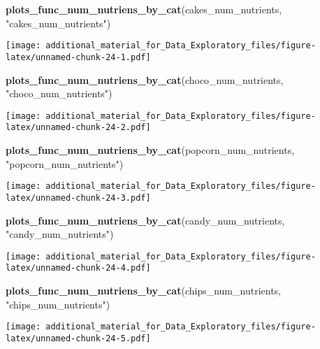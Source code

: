 \documentclass[
]{article}
\newenvironment{Shaded}{\begin{snugshade}}{\end{snugshade}}
\newcommand{\FunctionTok}[1]{\textcolor[rgb]{0.13,0.29,0.53}{\textbf{#1}}}
\newcommand{\NormalTok}[1]{#1}
\newcommand{\StringTok}[1]{\textcolor[rgb]{0.31,0.60,0.02}{#1}}
\begin{document}
\begin{Shaded}
\begin{Highlighting}[]
\FunctionTok{plots\_func\_num\_nutriens\_by\_cat}\NormalTok{(cakes\_num\_nutrients, }\StringTok{"cakes\_num\_nutrients"}\NormalTok{)}
\end{Highlighting}
\end{Shaded}

\texttt{[image: additional\_material\_for\_Data\_Exploratory\_files/figure-latex/unnamed-chunk-24-1.pdf]}

\begin{Shaded}
\begin{Highlighting}[]
\FunctionTok{plots\_func\_num\_nutriens\_by\_cat}\NormalTok{(choco\_num\_nutrients, }\StringTok{"choco\_num\_nutrients"}\NormalTok{)}
\end{Highlighting}
\end{Shaded}

\texttt{[image: additional\_material\_for\_Data\_Exploratory\_files/figure-latex/unnamed-chunk-24-2.pdf]}

\begin{Shaded}
\begin{Highlighting}[]
\FunctionTok{plots\_func\_num\_nutriens\_by\_cat}\NormalTok{(popcorn\_num\_nutrients, }\StringTok{"popcorn\_num\_nutrients"}\NormalTok{)}
\end{Highlighting}
\end{Shaded}

\texttt{[image: additional\_material\_for\_Data\_Exploratory\_files/figure-latex/unnamed-chunk-24-3.pdf]}

\begin{Shaded}
\begin{Highlighting}[]
\FunctionTok{plots\_func\_num\_nutriens\_by\_cat}\NormalTok{(candy\_num\_nutrients, }\StringTok{"candy\_num\_nutrients"}\NormalTok{)}
\end{Highlighting}
\end{Shaded}

\texttt{[image: additional\_material\_for\_Data\_Exploratory\_files/figure-latex/unnamed-chunk-24-4.pdf]}

\begin{Shaded}
\begin{Highlighting}[]
\FunctionTok{plots\_func\_num\_nutriens\_by\_cat}\NormalTok{(chips\_num\_nutrients, }\StringTok{"chips\_num\_nutrients"}\NormalTok{)}
\end{Highlighting}
\end{Shaded}

\texttt{[image: additional\_material\_for\_Data\_Exploratory\_files/figure-latex/unnamed-chunk-24-5.pdf]}
\end{document}
